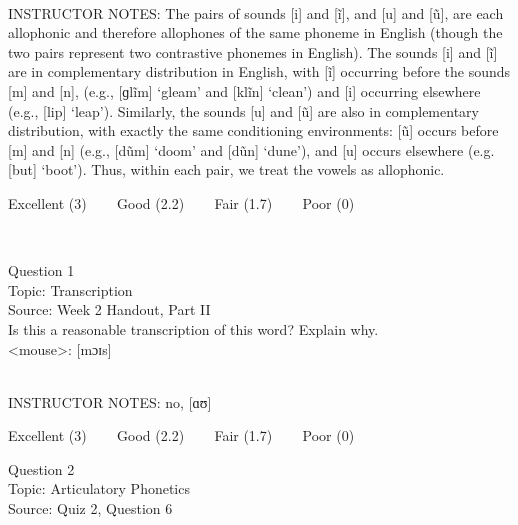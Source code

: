 \documentclass[12pt]{article}
\begin{document}
~\\
INSTRUCTOR NOTES: The pairs of sounds [i] and [ĩ], and [u] and [ũ], are each allophonic and therefore allophones of the same phoneme in English (though the two pairs represent two contrastive phonemes in English). The sounds [i] and [ĩ] are in complementary distribution in English, with [ĩ] occurring before the sounds [m] and [n], (e.g., [ɡlĩm] ‘gleam’ and [klĩn] ‘clean’) and [i] occurring elsewhere (e.g., [lip] ‘leap’). Similarly, the sounds [u] and [ũ] are also in complementary distribution, with exactly the same conditioning environments: [ũ] occurs before [m] and [n] (e.g., [dũm] ‘doom’ and [dũn] ‘dune’), and [u] occurs elsewhere (e.g. [but] ‘boot’). Thus, within each pair, we treat the vowels as allophonic. 


\vfill
Excellent (3) ~~~ Good (2.2) ~~~ Fair (1.7) ~~~ Poor (0)
\newpage

\begin{center}
\textbf{{\color{red}{\HUGE END OF EXAM}}}\\

\end{center}
\newpage

\begin{center}
\textbf{{\color{blue}{\HUGE START OF EXAM\\}}}

\textbf{{\color{blue}{\HUGE Student ID: 17393\\}}}

\textbf{{\color{blue}{\HUGE \\}}}

\end{center}
\newpage

{\large Question 1}\\

Topic: Transcription\\
Source: Week 2 Handout, Part II\\

Is this a reasonable transcription of this word? Explain why.\\

<mouse>: {[mɔɪs]}


~\\
INSTRUCTOR NOTES: no, [ɑʊ]


\vfill
Excellent (3) ~~~ Good (2.2) ~~~ Fair (1.7) ~~~ Poor (0)
\newpage

{\large Question 2}\\

Topic: Articulatory Phonetics\\
Source: Quiz 2, Question 6\\
\end{document}
